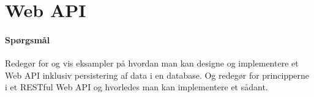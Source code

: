 \section{Web API}

\paragraph{Spørgsmål}
Redegør for og vis eksampler på hvordan man kan designe og implementere et Web API inklusiv persistering af data i en database. Og redegør for principperne i et RESTful Web API og hvorledes man kan implementere et sådant.